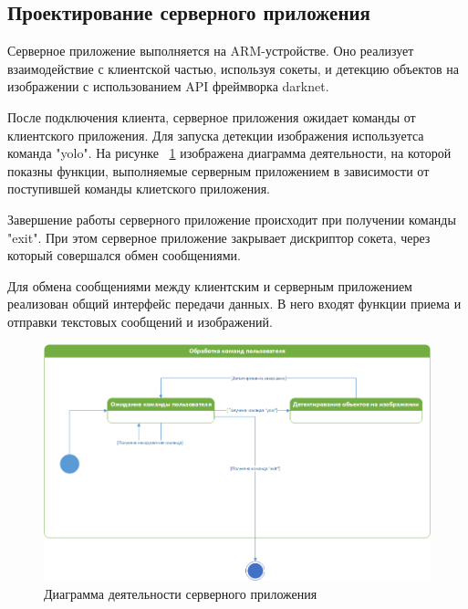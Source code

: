 \documentclass[a4paper,english,russian]{G2-105}
\begin{document}
\subsection{Проектирование серверного приложения} \ttl
\par Серверное приложение выполняется на ARM-устройстве. Оно реализует взаимодействие с клиентской частью, используя сокеты, и детекцию объектов на изображении с использованием API фреймворка darknet.
\par После подключения клиента, серверное приложения ожидает команды от клиентского приложения. Для запуска детекции изображения используетса команда "yolo". На рисунке ~\ref{state} изображена диаграмма деятельности, на которой показны функции, выполняемые серверным приложением в зависимости от поступившей команды клиетского приложения.
\par Завершение работы серверного приложение происходит при получении команды "exit". При этом серверное приложение закрывает дискриптор сокета, через который совершался обмен сообщениями.
\par Для обмена сообщениями между клиентским и серверным приложением реализован общий интерфейс передачи данных. В него входят функции приема и отправки текстовых сообщений и изображений.
\begin{figure}
    \includegraphics[width=\linewidth]{statediagramserver.png}
    \caption{Диаграмма деятельности серверного приложения}
	\label{state}
\end{figure}
\ttl
\end{document}
